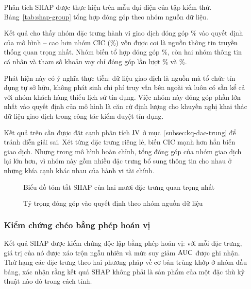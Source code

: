 Phân tích SHAP được thực hiện trên mẫu đại diện của tập kiểm thử.
Bảng~\ref{tab:shap-group} tổng hợp đóng góp theo nhóm nguồn dữ liệu.



Kết quả cho thấy nhóm đặc trưng hành vi giao dịch đóng góp
\ShapBehaviourPct{}\% vào quyết định của mô hình -- cao hơn nhóm CIC
(\ShapCICPct{}\%) vốn được coi là nguồn thông tin truyền thống quan trọng nhất.
Nhóm biến tổ hợp đóng góp \ShapDerivedPct{}\%, còn hai nhóm thông tin cá nhân và
tham số khoản vay chỉ đóng góp lần lượt \ShapStaticPct{}\% và \ShapLoanPct{}\%.

Phát hiện này có ý nghĩa thực tiễn: dữ liệu giao dịch là nguồn mà tổ chức tín
dụng tự sở hữu, không phát sinh chi phí truy vấn bên ngoài và luôn có sẵn kể cả
với nhóm khách hàng thiếu lịch sử tín dụng. Việc nhóm này đóng góp phần lớn nhất
vào quyết định của mô hình là căn cứ định lượng cho khuyến nghị khai thác dữ liệu
giao dịch trong công tác kiểm duyệt tín dụng.

Kết quả trên cần được đặt cạnh phân tích $\mathrm{IV}$ ở mục~\ref{subsec:kq-dac-trung} để
tránh diễn giải sai. Xét từng đặc trưng riêng lẻ, biến CIC mạnh hơn hẳn biến giao
dịch. Nhưng trong mô hình hoàn chỉnh, tổng đóng góp của nhóm giao dịch lại lớn
hơn, vì nhóm này gồm nhiều đặc trưng bổ sung thông tin cho nhau ở những khía cạnh
khác nhau của hành vi tài chính.

\begin{figure}[!htbp]
\centering
{}
\caption{Biểu đồ tóm tắt SHAP của hai mươi đặc trưng quan trọng nhất}
\label{fig:shap-summary}
\end{figure}

\begin{figure}[!htbp]
\centering
{}
\caption{Tỷ trọng đóng góp vào quyết định theo nhóm nguồn dữ liệu}
\label{fig:shap-group}
\end{figure}

\subsubsection{Kiểm chứng chéo bằng phép hoán vị}

Kết quả SHAP được kiểm chứng độc lập bằng phép hoán vị: với mỗi đặc trưng, giá
trị của nó được xáo trộn ngẫu nhiên và mức suy giảm $\mathrm{AUC}$ được ghi nhận. Thứ
hạng các đặc trưng theo hai phương pháp về cơ bản trùng khớp ở nhóm đầu bảng, xác
nhận rằng kết quả SHAP không phải là sản phẩm của một đặc thù kỹ thuật nào đó
trong cách tính.

